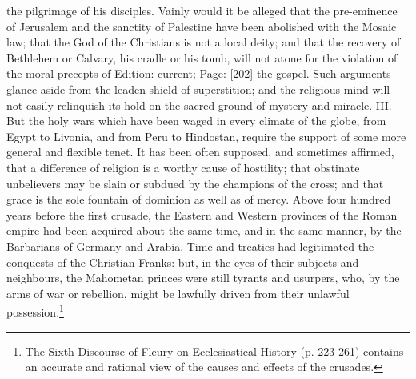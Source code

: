 the pilgrimage of his disciples. Vainly would it be alleged that the pre-eminence of Jerusalem and the sanctity of Palestine have been abolished with the Mosaic law; that the God of the Christians is not a local deity; and that the recovery of Bethlehem or Calvary, his cradle or his tomb, will not atone for the violation of the moral precepts of Edition: current; Page: [202] the gospel. Such arguments glance aside from the leaden shield of superstition; and the religious mind will not easily relinquish its hold on the sacred ground of mystery and miracle. III. But the holy wars which have been waged in every climate of the globe, from Egypt to Livonia, and from Peru to Hindostan, require the support of some more general and flexible tenet. It has been often supposed, and sometimes affirmed, that a difference of religion is a worthy cause of hostility; that obstinate unbelievers may be slain or subdued by the champions of the cross; and that grace is the sole fountain of dominion as well as of mercy. Above four hundred years before the first crusade, the Eastern and Western provinces of the Roman empire had been acquired about the same time, and in the same manner, by the Barbarians of Germany and Arabia. Time and treaties had legitimated the conquests of the Christian Franks: but, in the eyes of their subjects and neighbours, the Mahometan princes were still tyrants and usurpers, who, by the arms of war or rebellion, might be lawfully driven from their unlawful possession.\footnote{The Sixth Discourse of Fleury on Ecclesiastical History (p. 223-261) contains an accurate and rational view of the causes and effects of the crusades.}

